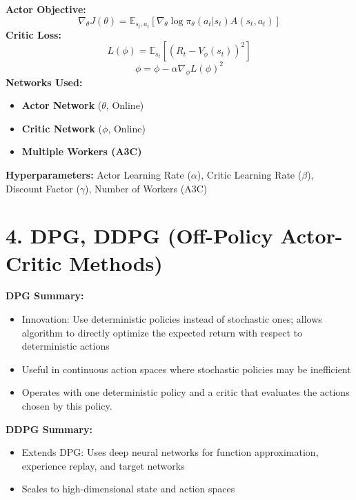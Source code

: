 \documentclass[letterpaper,10pt]{article}
\begin{document}
\begin{multicols}{2}
\noindent \textbf{Actor Objective:}
\[
\nabla_\theta J(\theta) = \mathbb{E}_{s_t, a_t} \left[ \nabla_\theta \log \pi_\theta(a_t | s_t) A(s_t, a_t) \right]
\]
\noindent \textbf{Critic Loss:}
\[
L(\phi) = \mathbb{E}_{s_t} \left[ \left( R_t - V_\phi(s_t) \right)^2 \right]
\]
\[
\phi = \phi - \alpha \nabla_\phi L(\phi)^2
\]
\textbf{Networks Used:}
\begin{itemize}
    \item \textbf{Actor Network} (\(\theta\), Online)
    \item \textbf{Critic Network} (\(\phi\), Online)
    \item \textbf{Multiple Workers (A3C)}
\end{itemize}
\textbf{Hyperparameters: }Actor Learning Rate (\(\alpha\)), Critic Learning Rate (\(\beta\)), Discount Factor (\(\gamma\)), Number of Workers (A3C)

\section*{4. DPG, DDPG (Off-Policy Actor-Critic Methods)}
\textbf{DPG Summary:}
\begin{itemize}
    \item Innovation: Use deterministic policies instead of stochastic ones; allows algorithm to directly optimize the expected return with respect to deterministic actions
    \item Useful in continuous action spaces where stochastic policies may be inefficient
    \item Operates with one deterministic policy and a critic that evaluates the actions chosen by this policy.
\end{itemize}

\noindent \textbf{DDPG Summary:}
\begin{itemize}
    \item Extends DPG: Uses deep neural networks for function approximation, experience replay, and target networks
    \item Scales to high-dimensional state and action spaces
\end{itemize}


\end{multicols}
\end{document}
